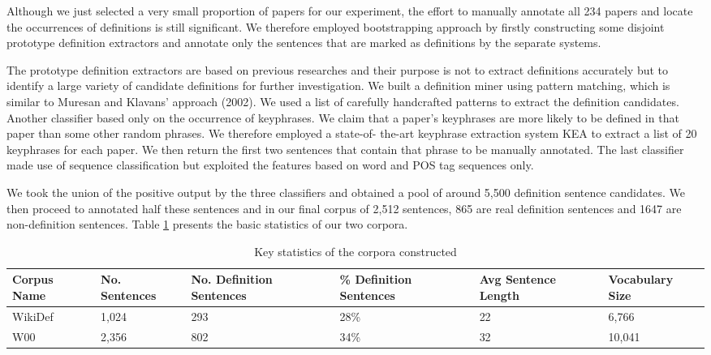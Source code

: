 \documentclass[hyp]{socreport}
\begin{document}
Although we just selected a very small proportion of papers for our experiment, the effort
to manually annotate all 234 papers and locate the occurrences of definitions is still
significant. We therefore employed bootstrapping approach by firstly constructing some
disjoint prototype definition extractors and annotate only the sentences that are marked as
definitions by the separate systems.

The prototype definition extractors are based on previous researches and their purpose is
not to extract definitions accurately but to identify a large variety of candidate definitions
for further investigation. We built a definition miner using pattern matching, which is
similar to Muresan and Klavans' approach (2002). We used a list of carefully handcrafted
patterns to extract the definition candidates. Another classifier based only on the
occurrence of keyphrases. We claim that a paper's keyphrases are more likely to be
defined in that paper than some other random phrases. We therefore employed a state-of-
the-art keyphrase extraction system KEA \cite{Witten1999} to extract a list of 20
keyphrases for each paper. We then return the first two sentences that contain that phrase
to be manually annotated. The last classifier made use of sequence classification but
exploited the features based on word and POS tag sequences only.

We took the union of the positive output by the three classifiers and obtained a pool of
around 5,500 definition sentence candidates. We then proceed to annotated half these
sentences and in our final corpus of 2,512 sentences, 865 are real definition sentences and
1647 are non-definition sentences. Table \ref{keystatistics} presents the basic statistics of our two
corpora.

\begin{table}
    \centering
    \begin{tabular}{|p{2.1cm}|p{2.1cm}|p{2.1cm}|p{2.1cm}|p{2.1cm}|p{2.1cm}|}
\hline
        \bf{Corpus Name}                            & \bf{No. \newline Sentences}                                  & \bf{No. \newline Definition Sentences} & \bf{\% \newline Definition Sentences}                      & \bf{Avg \newline Sentence Length} & \bf{Vocabulary Size}                                      \\ \hline
        WikiDef     & 1,024   & 293  & 28\%                     & 22 & 6,766                     \\ \hline
        W00 & 2,356 & 802    & 34\%                     & 32 & 10,041 \\ 
        \hline
    \end{tabular}
    \caption{Key statistics of the corpora constructed}
    \label{keystatistics}
\end{table}
\end{document}

